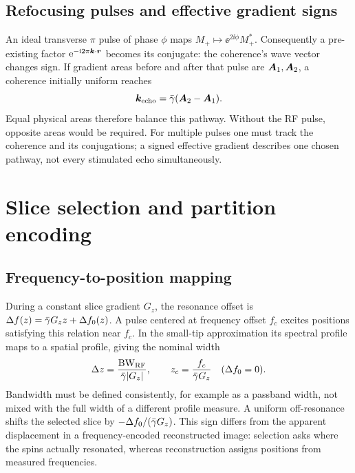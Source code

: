 \subsection{Refocusing pulses and effective gradient signs}
An ideal transverse \(\pi\) pulse of phase \(\phi\) maps
\(M_+\mapsto\ee^{2\ii\phi}M_+^*\). Consequently a pre-existing factor
\(\mathrm{e}^{-\mathrm{i}2\pi\bm{k}\cdot\bm{r}}\) becomes its conjugate: the coherence's wave vector changes sign. If gradient areas before and after that pulse are \(\bm{A}_1,\bm{A}_2\), a coherence initially uniform reaches
\begin{equation}
 \bm{k}_{\mathrm{echo}}=\bar{\gamma}(\bm{A}_2-\bm{A}_1).
 \label{eq:05:refocusing}
\end{equation}
Equal physical areas therefore balance this pathway. Without the RF pulse, opposite areas would be required. For multiple pulses one must track the coherence and its conjugations; a signed effective gradient describes one chosen pathway, not every stimulated echo simultaneously.

\section{Slice selection and partition encoding}
\label{sec:05:slice-selection-and-partition-encoding}
\subsection{Frequency-to-position mapping}
During a constant slice gradient \(G_z\), the resonance offset is
\(\Delta f(z)=\bar{\gamma} G_z z+\Delta f_0(z)\).
A pulse centered at frequency offset \(f_c\) excites positions satisfying this relation near \(f_c\). In the small-tip approximation its spectral profile maps to a spatial profile, giving the nominal width
\begin{equation}
 \Delta z=\frac{\mathrm{BW}_{\mathrm{RF}}}{\bar{\gamma} |G_z|},
 \qquad z_c=\frac{f_c}{\bar{\gamma} G_z}
 \quad(\Delta f_0=0).
\end{equation}
Bandwidth must be defined consistently, for example as a passband width, not mixed with the full width of a different profile measure. A uniform off-resonance shifts the selected slice by
\(-\Delta f_0/(\bar{\gamma} G_z)\). This sign differs from the apparent displacement in a frequency-encoded reconstructed image: selection asks where the spins actually resonated, whereas reconstruction assigns positions from measured frequencies.

